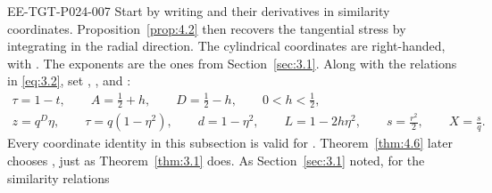 \begin{EESegment}{EE-TGT-P024-007}
Start by writing  and their derivatives in similarity
coordinates. Proposition~\ref{prop:4.2} then recovers the tangential stress by integrating
in the radial direction. The cylindrical coordinates
 are right-handed, with
. The exponents
 are the ones from Section~\ref{sec:3.1}. Along with the relations
in \eqref{eq:3.2}, set ,
, and :
\begin{equation}
\begin{gathered}
\tau=1-t,\qquad A=\frac12+h,\qquad D=\frac12-h,\qquad 0<h<\frac12,\\
z=q^D\eta,\qquad \tau=q(1-\eta^2),\qquad d=1-\eta^2,\qquad L=1-2h\eta^2,\qquad s=\frac{r^2}{2},\qquad X=\frac{s}{q}.
\end{gathered}
\tag{4.1}\label{eq:4.1}
\end{equation}
Every coordinate identity in this subsection is valid for
. Theorem~\ref{thm:4.6} later chooses
, just as Theorem~\ref{thm:3.1} does. As
Section~\ref{sec:3.1} noted, for  the similarity relations
\end{EESegment}
